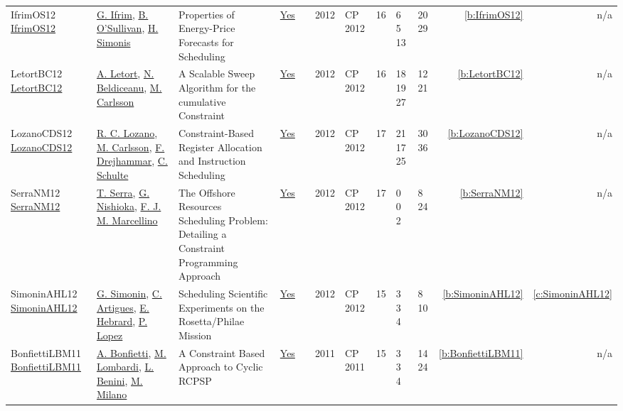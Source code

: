 {\begin{longtable}{>{\raggedright\arraybackslash}p{3cm}>{\raggedright\arraybackslash}p{4.5cm}>{\raggedright\arraybackslash}p{6.0cm}rrrp{2.5cm}rp{1cm}p{1cm}rr}
IfrimOS12 \href{https://doi.org/10.1007/978-3-642-33558-7_68}{IfrimOS12} & \hyperref[auth:a182]{G. Ifrim}, \hyperref[auth:a16]{B. O'Sullivan}, \hyperref[auth:a17]{H. Simonis} & Properties of Energy-Price Forecasts for Scheduling & \href{../works/IfrimOS12.pdf}{Yes} & \cite{IfrimOS12} & 2012 & CP 2012 & 16 & 6 5 13 & 20 29 & \ref{b:IfrimOS12} & n/a\\
LetortBC12 \href{https://doi.org/10.1007/978-3-642-33558-7_33}{LetortBC12} & \hyperref[auth:a127]{A. Letort}, \hyperref[auth:a128]{N. Beldiceanu}, \hyperref[auth:a91]{M. Carlsson} & A Scalable Sweep Algorithm for the cumulative Constraint & \href{../works/LetortBC12.pdf}{Yes} & \cite{LetortBC12} & 2012 & CP 2012 & 16 & 18 19 27 & 12 21 & \ref{b:LetortBC12} & n/a\\
LozanoCDS12 \href{https://doi.org/10.1007/978-3-642-33558-7_54}{LozanoCDS12} & \hyperref[auth:a1226]{R. C. Lozano}, \hyperref[auth:a91]{M. Carlsson}, \hyperref[auth:a1227]{F. Drejhammar}, \hyperref[auth:a92]{C. Schulte} & \cellcolor{green!10}Constraint-Based Register Allocation and Instruction Scheduling & \href{../works/LozanoCDS12.pdf}{Yes} & \cite{LozanoCDS12} & 2012 & CP 2012 & 17 & 21 17 25 & 30 36 & \ref{b:LozanoCDS12} & n/a\\
SerraNM12 \href{https://doi.org/10.1007/978-3-642-33558-7_59}{SerraNM12} & \hyperref[auth:a239]{T. Serra}, \hyperref[auth:a240]{G. Nishioka}, \hyperref[auth:a241]{F. J. M. Marcellino} & The Offshore Resources Scheduling Problem: Detailing a Constraint Programming Approach & \href{../works/SerraNM12.pdf}{Yes} & \cite{SerraNM12} & 2012 & CP 2012 & 17 & 0 0 2 & 8 24 & \ref{b:SerraNM12} & n/a\\
SimoninAHL12 \href{https://doi.org/10.1007/978-3-642-33558-7_5}{SimoninAHL12} & \hyperref[auth:a126]{G. Simonin}, \hyperref[auth:a6]{C. Artigues}, \hyperref[auth:a1]{E. Hebrard}, \hyperref[auth:a3]{P. Lopez} & \cellcolor{green!10}Scheduling Scientific Experiments on the Rosetta/Philae Mission & \href{../works/SimoninAHL12.pdf}{Yes} & \cite{SimoninAHL12} & 2012 & CP 2012 & 15 & 3 3 4 & 8 10 & \ref{b:SimoninAHL12} & \ref{c:SimoninAHL12}\\
BonfiettiLBM11 \href{https://doi.org/10.1007/978-3-642-23786-7_12}{BonfiettiLBM11} & \hyperref[auth:a198]{A. Bonfietti}, \hyperref[auth:a142]{M. Lombardi}, \hyperref[auth:a245]{L. Benini}, \hyperref[auth:a143]{M. Milano} & A Constraint Based Approach to Cyclic {RCPSP} & \href{../works/BonfiettiLBM11.pdf}{Yes} & \cite{BonfiettiLBM11} & 2011 & CP 2011 & 15 & 3 3 4 & 14 24 & \ref{b:BonfiettiLBM11} & n/a\\

\end{longtable}}
